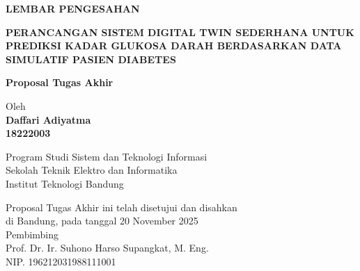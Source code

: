 \documentclass[12pt,a4paper,oneside]{book}
\begin{document}
\newpage
\thispagestyle{empty}
\begin{center}
  \textbf{\large LEMBAR PENGESAHAN}\\[1cm]
  \vspace*{1.5cm}
    
  {\large\bfseries PERANCANGAN SISTEM DIGITAL TWIN SEDERHANA UNTUK PREDIKSI KADAR GLUKOSA DARAH BERDASARKAN DATA SIMULATIF PASIEN DIABETES}\\
     \vspace{2cm}

  {\Large \textbf{Proposal Tugas Akhir}}\\


  \vspace{1.5cm}
    
    
  {\large Oleh}\\[0.3cm]
    \textbf{
    {\large Daffari Adiyatma}\\
    {\large 18222003}
  }\\
    
  \vspace{0.5cm}
 
  {\large Program Studi Sistem dan Teknologi Informasi}\\
  {\large Sekolah Teknik Elektro dan Informatika}\\
  {\large Institut Teknologi Bandung}\\

  \vspace{1.5cm}

  Proposal Tugas Akhir ini telah disetujui dan disahkan\\ 
  di Bandung, pada tanggal 20 November 2025\\[1cm]

	Pembimbing  \\[3cm]
	Prof. Dr. Ir. Suhono Harso Supangkat, M. Eng.   \\[0.2cm]
	NIP. 196212031988111001 

\end{center}

\vspace{1cm}
\noindent

\end{document}
